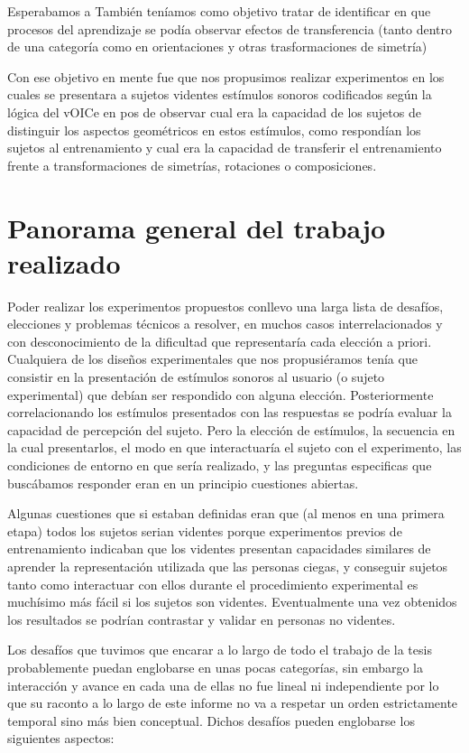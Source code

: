 \documentclass{article}
\begin{document}
    Esperabamos a También teníamos como objetivo tratar de identificar en que procesos del aprendizaje se podía observar efectos de transferencia (tanto dentro de una categoría como en orientaciones y otras trasformaciones de simetría)
    
    Con ese objetivo en mente fue que nos propusimos realizar experimentos en los cuales se presentara a sujetos videntes estímulos sonoros codificados según la lógica del vOICe en pos de observar cual era la capacidad de los sujetos de distinguir los aspectos geométricos en estos estímulos, como respondían los sujetos al entrenamiento y cual era la capacidad de transferir el entrenamiento frente a transformaciones de simetrías, rotaciones o composiciones. 


\section{Panorama general del trabajo realizado} \label{seccion:panorama}

    Poder realizar los experimentos propuestos conllevo una larga lista de desafíos, elecciones y problemas técnicos a resolver, en muchos casos interrelacionados y con desconocimiento de la dificultad que representaría cada elección a priori. Cualquiera de los diseños experimentales que nos propusiéramos tenía que consistir en la presentación de estímulos sonoros al usuario (o sujeto experimental) que debían ser respondido con alguna elección. Posteriormente correlacionando los estímulos presentados con las respuestas se podría evaluar la capacidad de percepción del sujeto. Pero la elección de estímulos, la secuencia en la cual presentarlos, el modo en que interactuaría el sujeto con el experimento, las condiciones de entorno en que sería realizado, y las preguntas especificas que buscábamos responder eran en un principio cuestiones abiertas.
    
    Algunas cuestiones que si estaban definidas eran que (al menos en una primera etapa) todos los sujetos serian videntes porque experimentos previos de entrenamiento \cite{VoiceEntrenamiento3} indicaban que los videntes presentan capacidades similares de aprender la representación utilizada que las personas ciegas, y conseguir sujetos tanto como interactuar con ellos durante el procedimiento experimental es muchísimo más fácil si los sujetos son videntes. Eventualmente una vez obtenidos los resultados se podrían contrastar y validar en personas no videntes. 
        
    Los desafíos que tuvimos que encarar a lo largo de todo el trabajo de la tesis probablemente puedan englobarse en unas pocas categorías, sin embargo la interacción y avance en cada una de ellas no fue lineal ni independiente por lo que su raconto a lo largo de este informe no va a respetar un orden estrictamente temporal sino más bien conceptual. Dichos desafíos pueden englobarse los siguientes aspectos:
    
\end{document}
